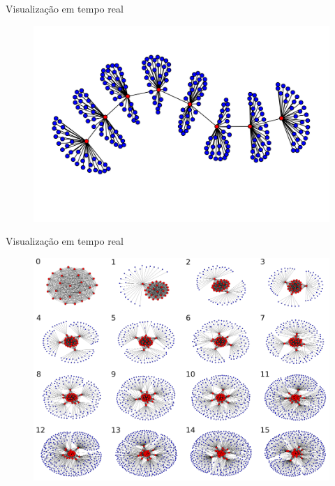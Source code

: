 \begin{frame}{Visualização em tempo real}

    \begin{figure}[!htb]
        \centering
        \includegraphics[scale=.6]{images/full-graph}
    \end{figure}
\end{frame}


\begin{frame}{Visualização em tempo real}

    \begin{figure}[!htb]
        \centering
        \includegraphics[scale=.25]{images/full-graph-ipe-0}
    \end{figure}
\end{frame}

